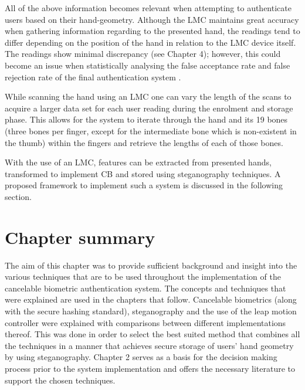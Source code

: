 All of the above information becomes relevant when attempting to authenticate users based on their hand-geometry. Although the LMC maintains great accuracy when gathering information regarding to the presented hand, the readings tend to differ depending on the position of the hand in relation to the LMC device itself. The readings show minimal discrepancy (see Chapter 4); however, this could become an issue when statistically analysing the false acceptance rate and false rejection rate of the final authentication system \citep{Nagar2009}.

While scanning the hand using an LMC one can vary the length of the scans to acquire a larger data set for each user reading during the enrolment and storage phase. This allows for the system to iterate through the hand and its 19 bones (three bones per finger, except for the intermediate bone which is non-existent in the thumb) within the fingers and retrieve the lengths of each of those bones.

With the use of an LMC, features can be extracted from presented hands, transformed to implement CB and stored using steganography techniques. A proposed framework to implement such a system is discussed in the following section.


\section[Chapter summary]{Chapter summary}

The aim of this chapter was to provide sufficient background and insight into the various techniques that are to be used throughout the implementation of the cancelable biometric authentication system. The concepts and techniques that were explained are used in the chapters that follow. Cancelable biometrics (along with the secure hashing standard), steganography and the use of the leap motion controller were explained with comparisons between different implementations thereof. This was done in order to select the best suited method that combines all the techniques in a manner that achieves secure storage of users’ hand geometry by using steganography.
Chapter 2 serves as a basis for the decision making process prior to the system implementation and offers the necessary literature to support the chosen techniques.


